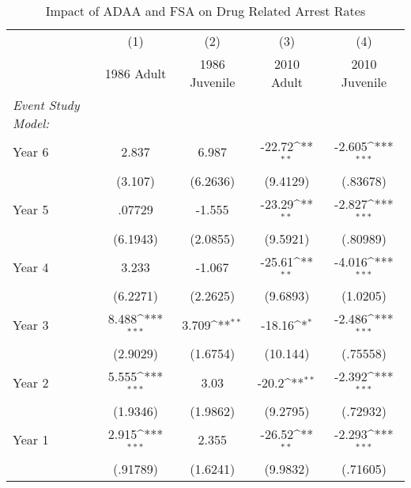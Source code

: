 \begin{table}[htbp]\centering
\def\sym#1{\ifmmode^{#1}\else\(^{#1}\)\fi}
\caption{Impact of ADAA and FSA on Drug Related Arrest Rates}
\begin{tabular}{l*{4}{c}}
\hline\hline
                    &\multicolumn{1}{c}{(1)}&\multicolumn{1}{c}{(2)}&\multicolumn{1}{c}{(3)}&\multicolumn{1}{c}{(4)}\\
                    &\multicolumn{1}{c}{1986 Adult}&\multicolumn{1}{c}{1986 Juvenile}&\multicolumn{1}{c}{2010 Adult}&\multicolumn{1}{c}{2010 Juvenile}\\
\hline
\emph{Event Study Model:}&                     &                     &                     &                     \\
[1em]
Year 6              &       2.837         &       6.987         &      -22.72\sym{**} &      -2.605\sym{***}\\
                    &     (3.107)         &    (6.2636)         &    (9.4129)         &    (.83678)         \\
[1em]
Year 5              &      .07729         &      -1.555         &      -23.29\sym{**} &      -2.827\sym{***}\\
                    &    (6.1943)         &    (2.0855)         &    (9.5921)         &    (.80989)         \\
[1em]
Year 4              &       3.233         &      -1.067         &      -25.61\sym{**} &      -4.016\sym{***}\\
                    &    (6.2271)         &    (2.2625)         &    (9.6893)         &    (1.0205)         \\
[1em]
Year 3              &       8.488\sym{***}&       3.709\sym{**} &      -18.16\sym{*}  &      -2.486\sym{***}\\
                    &    (2.9029)         &    (1.6754)         &    (10.144)         &    (.75558)         \\
[1em]
Year 2              &       5.555\sym{***}&        3.03         &       -20.2\sym{**} &      -2.392\sym{***}\\
                    &    (1.9346)         &    (1.9862)         &    (9.2795)         &    (.72932)         \\
[1em]
Year 1              &       2.915\sym{***}&       2.355         &      -26.52\sym{**} &      -2.293\sym{***}\\
                    &    (.91789)         &    (1.6241)         &    (9.9832)         &    (.71605)         \\

\end{tabular}
\end{table}
